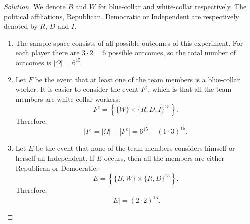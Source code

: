 \documentclass{article}[12pt]
\newenvironment{solution}
  {\renewcommand\qedsymbol{$\blacksquare$}\begin{proof}[Solution]}
  {\end{proof}}
\begin{document}
\begin{solution}
 We denote $B$ and $W$ for blue-collar and white-collar respectively.
 The political affiliations, Republican, Democratic or Independent are respectively denoted by $R$, $D$ and $I$.
\begin{enumerate}[label=(\alph*)]
    \item The sample space consists of all possible outcomes of this experiment.
    For each player there are $3\cdot 2 = 6$ possible outcomes, so the total number of outcomes is $|\Omega| = 6^{15}$.

    \item Let $F$ be the event that at least one of the team members is a blue-collar worker.
    It is easier to consider the event $F^{c}$, which is that all the team members are white-collar workers:
    \begin{equation*}
        F^{c} = \left\{\{W\}\times\{R, D, I\}^{15}\right\}.
    \end{equation*}
    Therefore,
    \begin{equation*}
        |F| = |\Omega| - |F^{c}| = 6^{15} - (1\cdot 3)^{15}.
    \end{equation*}

    \item Let $E$ be the event that none of the team members considers himself or herself an Independent.
    If $E$ occurs, then all the members are either Republican or Democratic.
    \begin{equation*}
        E = \left\{\{B, W\}\times\{R, D\}^{15}\right\}.
    \end{equation*}
    Therefore,
    \begin{equation*}
        |E| = (2\cdot 2)^{15}.
    \end{equation*}
\end{enumerate}
\end{solution}
\end{document}
